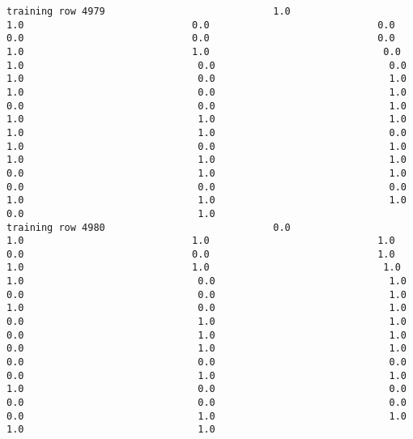 \documentclass[11pt]{article}
\begin{document}
\begin{verbatim}
training row 4979                             1.0                             1.0                             0.0                             0.0                             0.0                             0.0                             0.0                             1.0                             1.0                              0.0                              1.0                              0.0                              0.0                              1.0                              0.0                              1.0                              1.0                              0.0                              1.0                              0.0                              0.0                              1.0                              1.0                              1.0                              1.0                              1.0                              1.0                              0.0                              1.0                              0.0                              1.0                              1.0                              1.0                              1.0                              0.0                              1.0                              1.0                              0.0                              0.0                              0.0                              1.0                              1.0                              1.0                              0.0                              1.0
training row 4980                             0.0                             1.0                             1.0                             1.0                             0.0                             0.0                             1.0                             1.0                             1.0                              1.0                              1.0                              0.0                              1.0                              0.0                              0.0                              1.0                              1.0                              0.0                              1.0                              0.0                              1.0                              1.0                              0.0                              1.0                              1.0                              0.0                              1.0                              1.0                              0.0                              0.0                              0.0                              0.0                              1.0                              1.0                              1.0                              0.0                              0.0                              0.0                              0.0                              0.0                              0.0                              1.0                              1.0                              1.0                              1.0

\end{verbatim}
\end{document}
